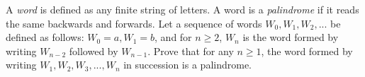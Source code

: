 A \emph{word} is defined as any finite string of letters. A word is a \emph{palindrome} if it reads the same backwards and forwards. Let a sequence of words $W_0, W_1, W_2,...$ be defined as follows: $W_0 = a, W_1 = b$, and for $n \ge 2$, $W_n$ is the word formed by writing $W_{n-2}$ followed by $W_{n-1}$. Prove that for any $n \ge 1$, the word formed by writing $W_1, W_2, W_3,..., W_n$ in succession is a palindrome.